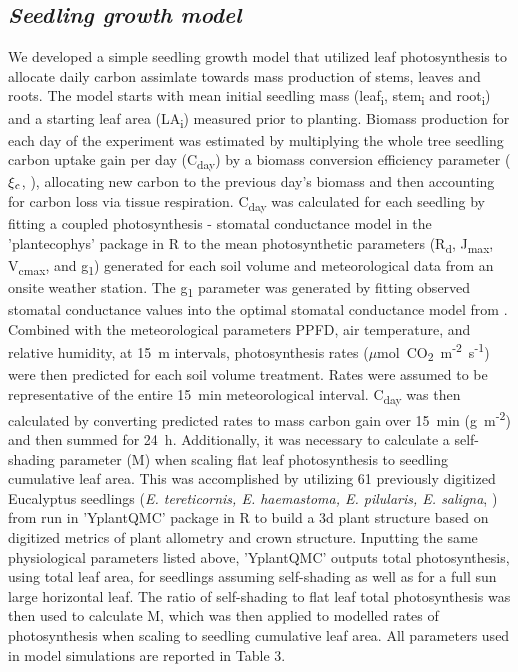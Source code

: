 \documentclass[a4paper]{article}\usepackage[]{graphicx}\usepackage[]{color}
\begin{document}
\subsection*{\textit{Seedling growth model}}
We developed a simple seedling growth model that utilized leaf photosynthesis to allocate daily carbon assimlate towards mass production of stems, leaves and roots. The model starts with mean initial seedling mass (leaf\textsubscript{i}, stem\textsubscript{i} and root\textsubscript{i}) and a starting leaf area (LA\textsubscript{i}) measured prior to planting. Biomass production for each day of the experiment was estimated by multiplying the whole tree seedling carbon uptake gain per day (C\textsubscript{day}) by a biomass conversion efficiency parameter ($\xi\textsubscript{c}$, \citet{zhu2008maximum}), allocating new carbon to the previous day’s biomass and then accounting for carbon loss via tissue respiration. C\textsubscript{day} was calculated for each seedling by fitting a coupled photosynthesis - stomatal conductance model \citep{farquhar1980biochemical,farquhar1982stomatal,medlyn2002temperature} in the 'plantecophys' package in R \citep{plantecophys} to the mean photosynthetic parameters (R\textsubscript{d}, J\textsubscript{max}, V\textsubscript{cmax}, and g\textsubscript{1}) generated for each soil volume and meteorological data from an onsite weather station.  The g\textsubscript{1} parameter was generated by fitting observed stomatal conductance values into the optimal stomatal conductance model from \citep{medlyn2012reconciling}. Combined with the meteorological parameters PPFD, air temperature, and relative humidity, at 15~m intervals, photosynthesis rates ($\mu$mol~CO\textsubscript{2}~m\textsuperscript{-2}~s\textsuperscript{-1}) were then predicted for each soil volume treatment. Rates were assumed to be representative of the entire 15~min meteorological interval. C\textsubscript{day} was then calculated by converting predicted rates to mass carbon gain over 15~min (g~m\textsuperscript{-2}) and then summed for 24~h. Additionally, it was necessary to calculate a self-shading parameter (M) when scaling flat leaf photosynthesis to seedling cumulative leaf area.  This was accomplished by utilizing 61 previously digitized Eucalyptus seedlings (\textit{E. tereticornis, E. haemastoma, E. pilularis, E. saligna}, \citep{duursma2012light}) from run in 'YplantQMC' package in R \citep{yplantqmc} to build a 3d plant structure based on digitized metrics of plant allometry and crown structure. Inputting the same physiological parameters listed above, 'YplantQMC' outputs total photosynthesis, using total leaf area, for seedlings assuming self-shading as well as for a full sun large horizontal leaf.  The ratio of self-shading to flat leaf total photosynthesis was then used to calculate M, which was then applied to modelled rates of photosynthesis when scaling to seedling cumulative leaf area. All parameters used in model simulations are reported in Table 3.
\end{document}
